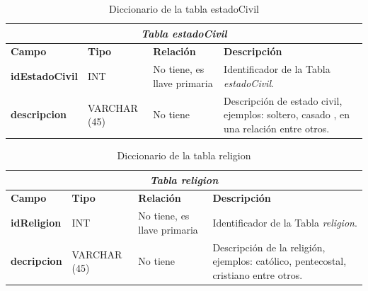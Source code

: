 \begin{table}[H]
\begin{center}
\begin{tabular}{||p{4cm}|p{}|p{}|p{5cm}||}
\hline
\multicolumn{4}{||c||}{\textit{\textbf{Tabla estadoCivil}}}\\
\hline 
\cellcolor{lightgray}\textbf{Campo} & \cellcolor{lightgray}\textbf{Tipo} & \cellcolor{lightgray}\textbf{Relación} & \cellcolor{lightgray}\textbf{Descripción} \\ \hline 
\textbf{idEstadoCivil} & {INT} & {No tiene, es llave primaria} & {Identificador de la Tabla \textit{estadoCivil}.} \\ \hline
\textbf{descripcion} & {VARCHAR (45)} & {No tiene} & {Descripción de estado civil, ejemplos: soltero, casado , en una relación entre otros.} \\ \hline
\end{tabular}
\caption{Diccionario de la tabla estadoCivil}
\label{Tabla:estadoCivil}
\end{center}
\end{table}

\begin{table}[H]
\begin{center}
\begin{tabular}{||p{4cm}|p{}|p{}|p{5cm}||}
\hline
\multicolumn{4}{||c||}{\textit{\textbf{Tabla religion}}}\\
\hline 
\cellcolor{lightgray}\textbf{Campo} & \cellcolor{lightgray}\textbf{Tipo} & \cellcolor{lightgray}\textbf{Relación} & \cellcolor{lightgray}\textbf{Descripción} \\ \hline 
\textbf{idReligion} & {INT} & {No tiene, es llave primaria} & {Identificador de la Tabla \textit{religion}.} \\ \hline
\textbf{decripcion} & {VARCHAR (45)} & {No tiene} & {Descripción de la religión, ejemplos: católico, pentecostal, cristiano entre otros.} \\ \hline
\end{tabular}
\caption{Diccionario de la tabla religion}
\label{Tabla:religion}
\end{center}
\end{table}


